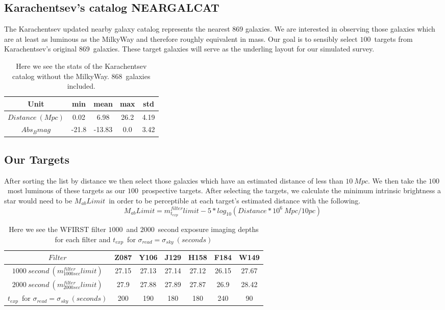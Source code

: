 \documentclass[11pt,a4paper,fleqn,notitlepage,oneside]{article}
\begin{document}
	\subsection{Karachentsev's catalog NEARGALCAT} %
		\label{sub:karachentsev_s_catalog_neargalcat}
		The Karachentsev\cite{2013AJ....145..101K} updated nearby galaxy catalog represents the nearest 869 galaxies.
		We are interested in observing those galaxies which are at least as luminous as the MilkyWay and therefore roughly equivalent in mass.
		Our goal is to sensibly select $100$\ targets from Karachentsev's original $869$\ galaxies.
		These target galaxies will serve as the underling layout for our simulated survey.
		\begin{table}[H]\centering
			\begin{tabular}{||c|cccc||}%
				\hline 
				Unit & min & mean & max & std \\
				\midrule[1.5pt]
				$Distance\ (Mpc)$ & 0.02 & 6.98 & 26.2 & 4.19 \\
				$Abs_{B}mag$ & -21.8 & -13.83 & 0.0 & 3.42 \\
			\hline
			\end{tabular}
		\caption{
			Here we see the stats of the Karachentsev\cite{2013AJ....145..101K} catalog without the MilkyWay.
			$868$\ galaxies included.
			}
		\label{tab:1}
		\end{table}

	\subsection{Our Targets} %
		\label{sub:our_targets}
		After sorting the list by distance we then select those galaxies which have an estimated distance of less than $10\ Mpc$.
		We then take the $100$\ most luminous of these targets as our $100$\ prospective targets.
		After selecting the targets, we calculate the minimum intrinsic brightness a star would need to be $M_{ab}Limit$\ in order to be perceptible at each target's estimated distance with the following.
		\[
		M_{ab}Limit = m^{filter}_{t_{exp}}limit - 5 * log_{10}(Distance*10^{6}\ Mpc/10pc)\ 
		\]
		\begin{table}[H]\centering
			\begin{tabular}{||c|cccccc||}%
				\hline 
				$Filter$ & Z087 & Y106 & J129 & H158 & F184 & W149\\
				\midrule[1.5pt]
				$1000\ second\ (m^{filter}_{1000sec}limit) $ & 27.15 & 27.13 & 27.14 & 27.12 & 26.15 & 27.67\\
				$2000\ second\ (m^{filter}_{2000sec}limit) $ & 27.9 & 27.88 & 27.89 & 27.87 & 26.9 & 28.42\\
				$t_{exp}$\ for $\sigma_{read}=\sigma_{sky}\ (seconds)$ & 200 & 190 & 180 & 180 & 240 & 90\\
			\hline
			\end{tabular}
		\caption{
			Here we see the WFIRST filter $1000$\ and $2000$\ second exposure imaging depths for each filter and $t_{exp}$\ for $\sigma_{read}=\sigma_{sky}\ (seconds)$
			}
		\label{tab:2}
		\end{table}
\end{document}
